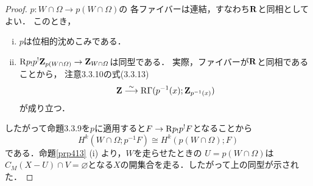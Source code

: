 \begin{proof}
    \(p\colon W\cap\varOmega \to p(W\cap\varOmega)\)の
    各ファイバーは連結，すなわち\(\mathbf{R}\)と同相としてよい．
    このとき，\begin{enumerate}[(i)]
        \item \(p\)は位相的沈めこみである．
        \item \(
            \mathrm{R}{p}_{!}p^{!}\mathbf{Z}_{p(W\cap\varOmega)}
            \to\mathbf{Z}_{W\cap\varOmega}
        \)は同型である．
        実際，ファイバーが\(\mathbf{R}\)と同相であることから，
        注意3.3.10の式(3.3.13)\[
            \mathbf{Z}\mathrel{\overset{\sim}{\longrightarrow}}\mathop{\mathrm{R}\hspace{-0pt}\Gamma}\nolimits(p^{-1}(x);\mathbf{Z}_{p^{-1}(x)})
        \]が成り立つ．
    \end{enumerate}したがって命題3.3.9を\(p\)に適用すると\(
        F\to \mathrm{R}{p}_{!}p^{!}F
    \)となることから\[
        H^{k}(W\cap\varOmega;p^{-1}F)
        \cong 
        H^{k}(p(W\cap\varOmega);F)
    \]である．命題\ref{prp413} (i) より，\(W\)を走らせたときの
    \(U=p(W\cap\varOmega)\)は\(
        C_{M}(X-U)\cap V=\varnothing
    \)となる\(X\)の開集合を走る．したがって上の同型が示された．


\end{proof}

